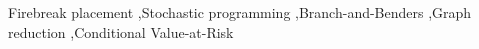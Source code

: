 \documentclass[a4paper,fleqn]{cas-sc}
\begin{document}
\begin{keywords}
Firebreak placement \sep Stochastic programming \sep Branch-and-Benders
\sep Graph reduction \sep Conditional Value-at-Risk
\end{keywords}
\maketitle











\end{document}
